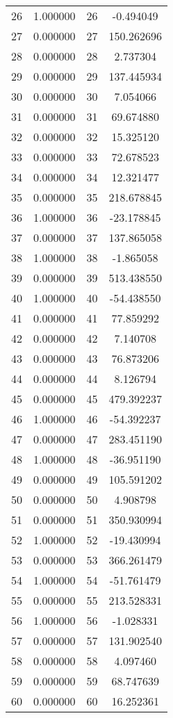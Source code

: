 \documentclass[12pt]{article}
\begin{document}
\begin{longtable}{@{}cccc@{}}
26 & 1.000000 & 26 & -0.494049 \\
27 & 0.000000 & 27 & 150.262696 \\
28 & 0.000000 & 28 & 2.737304 \\
29 & 0.000000 & 29 & 137.445934 \\
30 & 0.000000 & 30 & 7.054066 \\
31 & 0.000000 & 31 & 69.674880 \\
32 & 0.000000 & 32 & 15.325120 \\
33 & 0.000000 & 33 & 72.678523 \\
34 & 0.000000 & 34 & 12.321477 \\
35 & 0.000000 & 35 & 218.678845 \\
36 & 1.000000 & 36 & -23.178845 \\
37 & 0.000000 & 37 & 137.865058 \\
38 & 1.000000 & 38 & -1.865058 \\
39 & 0.000000 & 39 & 513.438550 \\
40 & 1.000000 & 40 & -54.438550 \\
41 & 0.000000 & 41 & 77.859292 \\
42 & 0.000000 & 42 & 7.140708 \\
43 & 0.000000 & 43 & 76.873206 \\
44 & 0.000000 & 44 & 8.126794 \\
45 & 0.000000 & 45 & 479.392237 \\
46 & 1.000000 & 46 & -54.392237 \\
47 & 0.000000 & 47 & 283.451190 \\
48 & 1.000000 & 48 & -36.951190 \\
49 & 0.000000 & 49 & 105.591202 \\
50 & 0.000000 & 50 & 4.908798 \\
51 & 0.000000 & 51 & 350.930994 \\
52 & 1.000000 & 52 & -19.430994 \\
53 & 0.000000 & 53 & 366.261479 \\
54 & 1.000000 & 54 & -51.761479 \\
55 & 0.000000 & 55 & 213.528331 \\
56 & 1.000000 & 56 & -1.028331 \\
57 & 0.000000 & 57 & 131.902540 \\
58 & 0.000000 & 58 & 4.097460 \\
59 & 0.000000 & 59 & 68.747639 \\
60 & 0.000000 & 60 & 16.252361 \\

\end{longtable}
\end{document}
